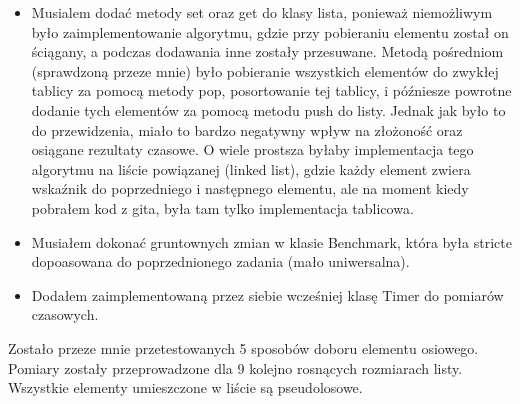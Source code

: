 \documentclass[11pt]{article}
\begin{document}
\begin{itemize}
  \item Musialem dodać metody set oraz get do klasy lista, ponieważ niemożliwym było zaimplementowanie 
  algorytmu, gdzie przy pobieraniu elementu został on ściągany, a podczas dodawania inne zostały przesuwane. Metodą pośredniom (sprawdzoną przeze mnie) było pobieranie wszystkich elementów do zwykłej tablicy za pomocą metody pop, posortowanie tej tablicy, i późniesze powrotne dodanie tych 
  elementów za pomocą metodu push do listy. Jednak jak było to do przewidzenia, miało to bardzo negatywny wpływ na złożoność oraz osiągane rezultaty czasowe. O wiele prostsza byłaby implementacja tego algorytmu na liście powiązanej (linked list), gdzie każdy element zwiera wskaźnik do poprzedniego i następnego elementu, ale na moment kiedy pobrałem kod z gita, była tam tylko implementacja tablicowa.
  \item Musiałem dokonać gruntownych zmian w klasie Benchmark, która była stricte dopoasowana do poprzednionego zadania (mało uniwersalna).
  \item Dodałem zaimplementowaną przez siebie wcześniej klasę Timer do pomiarów czasowych.
\end{itemize}
Zostało przeze mnie przetestowanych 5 sposobów doboru elementu osiowego. Pomiary zostały przeprowadzone dla 9 kolejno rosnących rozmiarach listy. Wszystkie elementy umieszczone w liście są pseudolosowe.
\end{document}
